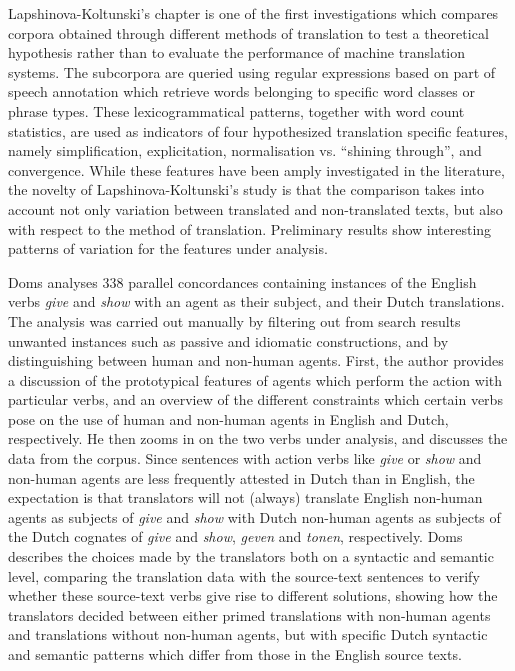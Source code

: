 \documentclass[output=paper]{LSP/langsci}
\begin{document}
Lapshinova-Koltunski’s chapter is one of the first investigations which compares corpora obtained through different methods of translation to test a theoretical hypothesis rather than to evaluate the performance of machine translation systems. The subcorpora are queried using regular expressions based on part of speech annotation which retrieve words belonging to specific word classes or phrase types. These lexicogrammatical patterns, together with word count statistics, are used as indicators of four hypothesized translation specific features, namely simplification, explicitation, normalisation vs. “shining through”, and convergence. While these features have been amply investigated in the literature, the novelty of Lapshinova-Koltunski’s study is that the comparison takes into account not only variation between translated and non-translated texts, but also with respect to the method of translation. Preliminary results show interesting patterns of variation for the features under analysis.

Doms analyses 338 parallel concordances containing instances of the English verbs \textit{give} and \textit{show} with an agent as their subject, and their Dutch translations. The analysis was carried out manually by filtering out from search results unwanted instances such as passive and idiomatic constructions, and by distinguishing between human and non-human agents. First, the author provides a discussion of the prototypical features of agents which perform the action with particular verbs, and an overview of the different constraints which certain verbs pose on the use of human and non-human agents in English and Dutch, respectively. He then zooms in on the two verbs under analysis, and discusses the data from the corpus. Since sentences with action verbs like \textit{give} or \textit{show} and non-human agents are less frequently attested in Dutch than in English, the expectation is that translators will not (always) translate English non-human agents as subjects of \textit{give} and \textit{show} with Dutch non-human agents as subjects of the Dutch cognates of \textit{give} and \textit{show}, \textit{geven} and \textit{tonen}, respectively. Doms describes the choices made by the translators both on a syntactic and semantic level, comparing the translation data with the source-text sentences to verify whether these source-text verbs give rise to different solutions, showing how the translators decided between either primed translations with non-human agents and translations without non-human agents, but with specific Dutch syntactic and semantic patterns which differ from those in the English source texts.
\end{document}
